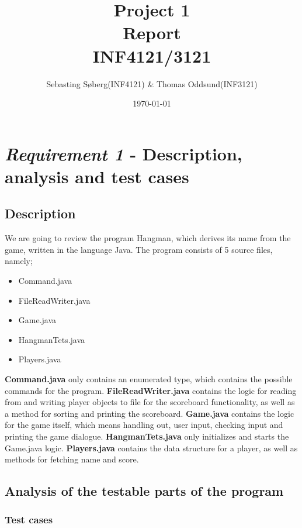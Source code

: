 \documentclass{article}
\title{Project 1 \\ Report \\ INF4121/3121} %
\date{\today} %
\author{Sebasting Søberg(INF4121) \& Thomas Oddsund(INF3121)}
\begin{document}
\maketitle %

\section{\textit{Requirement 1} - Description, analysis and test cases}

	\subsection{Description}
	We are going to review the program Hangman, which derives its name from the game, written in the language Java. The program consists of 5 source files, namely;
	\begin{itemize}
	\item Command.java
	\item FileReadWriter.java
	\item Game.java
	\item HangmanTets.java
	\item Players.java
	\end{itemize}

	\textbf{Command.java} only contains an enumerated type, which contains the possible commands for the program. \textbf{FileReadWriter.java} contains the logic for reading from and writing player objects to file for the scoreboard functionality, as well as a method for sorting and printing the scoreboard. \textbf{Game.java} contains the logic for the game itself, which means handling out, user input, checking input and printing the game dialogue. \textbf{HangmanTets.java} only initializes and starts the Game.java logic. \textbf{Players.java} contains the data structure for a player, as well as methods for fetching name and score.

	\subsection{Analysis of the testable parts of the program\newline}

	\subsubsection{Test cases}
	
\end{document}
